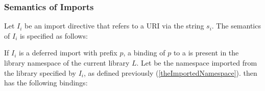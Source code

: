 \documentclass[makeidx]{article}
\begin{document}
{\subsubsection{Semantics of Imports}

\LMHash{}%
Let $I_i$ be an import directive that refers to a URI via the string $s_i$.
The semantics of $I_i$ is specified as follows:

\LMHash{}%
If $I_i$ is a deferred import with prefix $p$, a binding of $p$ to a
 is
present in the library namespace of the current library $L$.
Let  be
the namespace imported from the library specified by $I_i$,
as defined previously
(\ref{theImportedNamespace}).
 then has the following bindings:

}
\end{document}

